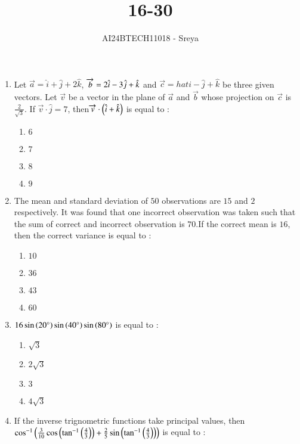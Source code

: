 \documentclass[journal,12pt,onecolumn]{IEEEtran}
\theoremstyle{remark}
\begin{document}

\vspace{3cm}

\title{16-30}
\author{AI24BTECH11018 - Sreya}
\maketitle
\bigskip
\renewcommand{\thefigure}{\theenumi}
\renewcommand{\thetable}{\theenumi}
\begin{enumerate}
    \item Let $\overrightarrow{a}=\hat{i}+\hat{j}+2\hat{k}$, $\overrightarrow{b}=2\hat{i}-3\Hat{j}+\hat{k}$ and $\overrightarrow{c}=hat{i}-\hat{j}+\hat{k}$ be three given vectors. Let $\overrightarrow{v}$ be a vector in the plane of $\overrightarrow{a}$ and $\overrightarrow{b}$ whose projection on $\overrightarrow{c}$ is $\frac{2}{\sqrt{3}}$. If $\overrightarrow{v}\cdot\hat{j}=7$, then$\overrightarrow{v}\cdot\left(\hat{i}+\hat{k}\right)$ is equal to :
    \begin{enumerate}
        \item $6$
        \item $7$
        \item $8$
        \item $9$
    \end{enumerate}
    \item The mean and standard deviation of $50$ observations are $15$ and $2$ respectively. It was found that one incorrect observation was taken such that the sum of correct and incorrect observation is $70$.If the correct mean is $16$, then the correct variance is equal to :
    \begin{enumerate}
        \item $10$
        \item $36$
        \item $43$
        \item $60$
    \end{enumerate}
    \item $16\sin{\ensuremath{\left(20^\circ\right)}}\sin{\ensuremath{\left(40^\circ\right)}}\sin{\ensuremath{\left(80^\circ\right)}}$ is equal to :
    \begin{enumerate}
        \item $\sqrt{3}$
        \item $2\sqrt{3}$
        \item $3$
        \item $4\sqrt{3}$
    \end{enumerate}
    \item If the inverse trignometric functions take principal values, then $\cos^{-1}\left(\frac{3}{10}\cos\left(\tan^{-1}\left(\frac{4}{3}\right)\right)+\frac{2}{5}\sin\left(\tan^{-1}\left(\frac{4}{3}\right)\right)\right)$ is equal to :

\end{enumerate}
\end{document}
